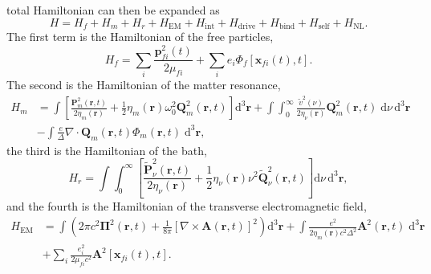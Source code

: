 \documentclass{article}
\begin{document}
total Hamiltonian can then be expanded as
\begin{equation}
H = H_f + H_m + H_r + H_\mathrm{EM} + H_\mathrm{int} + H_\mathrm{drive} + H_\mathrm{bind} + H_\mathrm{self} + H_\mathrm{NL}.
\end{equation}
The first term is the Hamiltonian of the free particles,
\begin{equation}
H_f = \sum_i\frac{\mathbf{p}_{fi}^2(t)}{2\mu_{fi}} + \sum_ie_i\Phi_f[\mathbf{x}_{fi}(t),t].
\end{equation}
The second is the Hamiltonian of the matter resonance,
\begin{equation}
\begin{split}
H_m &= \int\left[\frac{\mathbf{P}_m^2(\mathbf{r},t)}{2\eta_m(\mathbf{r})} + \frac{1}{2}\eta_m(\mathbf{r})\omega_0^2\mathbf{Q}_m^2(\mathbf{r},t)\right]\mathrm{d}^3\mathbf{r} + \int\int_0^\infty\frac{\tilde{v}^2(\nu)}{2\eta_\nu(\mathbf{r})}\mathbf{Q}_m^2(\mathbf{r},t)\;\mathrm{d}\nu\,\mathrm{d}^3\mathbf{r}\\
&- \int\frac{e}{\Delta}\nabla\cdot\mathbf{Q}_m(\mathbf{r},t)\Phi_m(\mathbf{r},t)\;\mathrm{d}^3\mathbf{r},
\end{split}
\end{equation}
the third is the Hamiltonian of the bath,
\begin{equation}
H_r = \int\int_0^\infty\left[\frac{\tilde{\mathbf{P}}_\nu^2(\mathbf{r},t)}{2\eta_\nu(\mathbf{r})} + \frac{1}{2}\eta_\nu(\mathbf{r})\nu^2\tilde{\mathbf{Q}}_\nu^2(\mathbf{r},t)\right]\mathrm{d}\nu\,\mathrm{d}^3\mathbf{r},
\end{equation}
and the fourth is the Hamiltonian of the transverse electromagnetic field,
\begin{equation}
\begin{split}
H_\mathrm{EM} &= \int\left(2\pi c^2\bm{\Pi}^2(\mathbf{r},t) + \frac{1}{8\pi}\left[\nabla\times\mathbf{A}(\mathbf{r},t)\right]^2\right)\mathrm{d}^3\mathbf{r} + \int\frac{e^2}{2\eta_m(\mathbf{r})c^2\Delta^2}\mathbf{A}^2(\mathbf{r},t)\;\mathrm{d}^3\mathbf{r}\\&+ \sum_i\frac{e_i^2}{2\mu_{fi}c^2}\mathbf{A}^2[\mathbf{x}_{fi}(t),t].
\end{split}
\end{equation}
\end{document}
